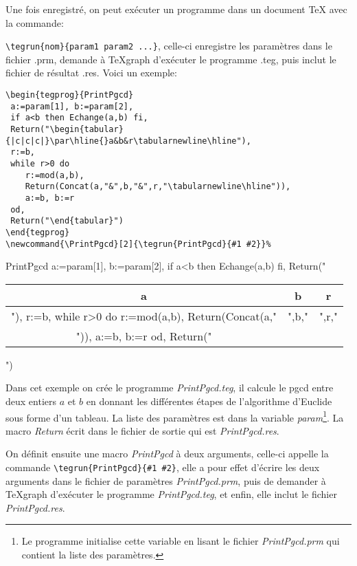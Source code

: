 Une fois enregistré, on peut exécuter un programme dans un document \TeX{} avec la commande:\par
\verb|\tegrun{nom}{param1 param2 ...}|, celle-ci enregistre les paramètres dans le fichier .prm, demande à TeXgraph d'exécuter le programme .teg, puis inclut le fichier de résultat .res. Voici un exemple:
\begin{small}
\begin{verbatim}
\begin{tegprog}{PrintPgcd}
 a:=param[1], b:=param[2], 
 if a<b then Echange(a,b) fi,
 Return("\begin{tabular}{|c|c|c|}\par\hline{}a&b&r\tabularnewline\hline"),
 r:=b,
 while r>0 do 
    r:=mod(a,b),
    Return(Concat(a,"&",b,"&",r,"\tabularnewline\hline")),
    a:=b, b:=r
 od,
 Return("\end{tabular}")
\end{tegprog}
\newcommand{\PrintPgcd}[2]{\tegrun{PrintPgcd}{#1 #2}}%
\end{verbatim}
\end{small}

\begin{tegprog}{PrintPgcd}
a:=param[1], b:=param[2], 
if a<b then Echange(a,b) fi,
Return("\begin{tabular}{|c|c|c|}\par\hline{}a&b&r\tabularnewline\hline"),
r:=b,
while r>0 do 
    r:=mod(a,b),
    Return(Concat(a,"&",b,"&",r,"\tabularnewline\hline")),
    a:=b, b:=r
od,
Return("\end{tabular}")
\end{tegprog}

\newcommand{\PrintPgcd}[2]{\tegrun{PrintPgcd}{#1 #2}}%

Dans cet exemple on crée le programme \textit{PrintPgcd.teg}, il calcule le pgcd entre deux entiers $a$ et $b$ en donnant les différentes étapes de l'algorithme d'Euclide sous forme d'un tableau. La liste des paramètres est dans la variable \textit{param}\footnote{Le programme initialise cette variable en lisant le fichier \textit{PrintPgcd.prm} qui contient la liste des paramètres.}. La macro \textit{Return} écrit dans le fichier de sortie qui est \textit{PrintPgcd.res}.

On définit ensuite une macro \textit{PrintPgcd} à deux arguments, celle-ci appelle la commande \verb|\tegrun{PrintPgcd}{#1 #2}|, elle a pour effet d'écrire les deux arguments dans le fichier de paramètres \textit{PrintPgcd.prm}, puis de demander à TeXgraph d'exécuter le programme \textit{PrintPgcd.teg}, et enfin, elle inclut le fichier \textit{PrintPgcd.res}.

